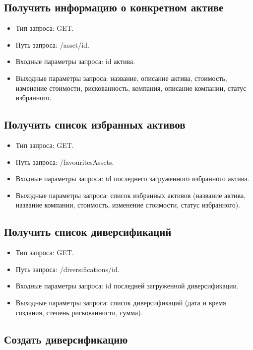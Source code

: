\documentclass[a4paper, 14pt]{article}
\begin{document}
\subsection{Получить информацию о конкретном активе}

\begin{itemize}
    \item Тип запроса: GET.
    \item Путь запроса: /asset/{id}.
    \item Входные параметры запроса: id актива.
    \item Выходные параметры запроса: название, описание актива, стоимость, изменение стоимости, рискованность, компания, описание компании, статус избранного.
\end{itemize}

\subsection{Получить список избранных активов}

\begin{itemize}
    \item Тип запроса: GET.
    \item Путь запроса: /favouritesAssets.
    \item Входные параметры запроса: id последнего загруженного избранного актива.
    \item Выходные параметры запроса: список избранных активов (название актива, название компании, стоимость, изменение стоимости, статус избранного).
\end{itemize}

\subsection{Получить список диверсификаций}

\begin{itemize}
    \item Тип запроса: GET.
    \item Путь запроса: /diversifications/{id}.
    \item Входные параметры запроса: id последней загруженной диверсификации.
    \item Выходные параметры запроса: список диверсификаций (дата и время создания, степень рискованности, сумма).
\end{itemize}

\subsection{Создать диверсификацию}
\end{document}
